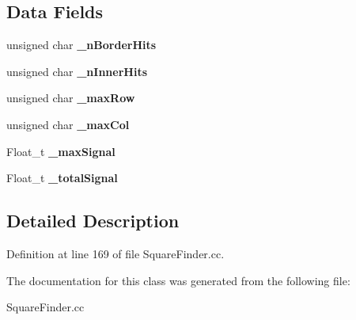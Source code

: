 \subsection*{Data Fields}
\begin{DoxyCompactItemize}
\item 
unsigned char {\bfseries \-\_\-n\-Border\-Hits}\label{classCALICE_1_1WaferInfo__t_a621edca54c4166f865da90aa8b395ea7}

\item 
unsigned char {\bfseries \-\_\-n\-Inner\-Hits}\label{classCALICE_1_1WaferInfo__t_a00278142ce3014e3c2f7d98202adcf80}

\item 
unsigned char {\bfseries \-\_\-max\-Row}\label{classCALICE_1_1WaferInfo__t_a41c81c4926b86743f170e8faeadff528}

\item 
unsigned char {\bfseries \-\_\-max\-Col}\label{classCALICE_1_1WaferInfo__t_a92af46b078ed24127a392ffe7aa27b05}

\item 
Float\-\_\-t {\bfseries \-\_\-max\-Signal}\label{classCALICE_1_1WaferInfo__t_ac2a779dbfcccd850562e96b2fc397014}

\item 
Float\-\_\-t {\bfseries \-\_\-total\-Signal}\label{classCALICE_1_1WaferInfo__t_ac0f78a4c015765f1d71de3d2a55d1ef0}

\end{DoxyCompactItemize}


\subsection{Detailed Description}


Definition at line 169 of file Square\-Finder.\-cc.



The documentation for this class was generated from the following file\-:\begin{DoxyCompactItemize}
\item 
Square\-Finder.\-cc\end{DoxyCompactItemize}
